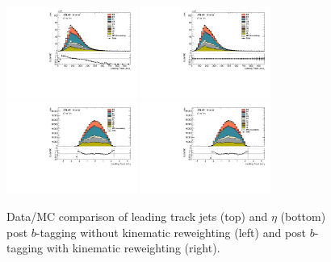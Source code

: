 \begin{figure}[htbp]
  \centering
 \includegraphics[width=0.38\textwidth]{figures/gbb/LeadTrkJet_pT_PreReweight.pdf}
 \includegraphics[width=0.38\textwidth]{figures/gbb/LeadTrkJet_pT_Reweight.pdf}
 \includegraphics[width=0.38\textwidth]{figures/gbb/LeadTrkJet_eta_PreReweight.pdf}
 \includegraphics[width=0.38\textwidth]{figures/gbb/LeadTrkJet_eta_Reweight.pdf}
\caption{Data/MC comparison of leading track jets \pt (top) and $\eta$ (bottom) post $b$-tagging without kinematic reweighting (left) and post $b$-tagging with kinematic reweighting (right).} %
  \label{fig:gbb-pT_leadtrkjets}
\end{figure}


